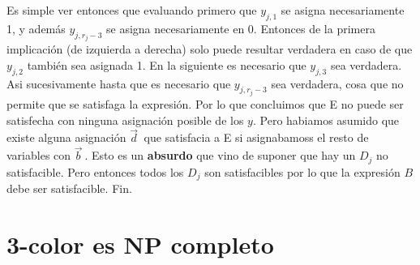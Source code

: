 \documentclass{article}
\begin{document}
Es simple ver entonces que evaluando primero que $y_{j,1}$ se asigna necesariamente 1, y además
$y_{j,r_j-3}$ se asigna necesariamente en 0. Entonces de la primera implicación (de izquierda a
derecha) solo puede resultar verdadera en caso de que $y_{j,2}$ también sea asignada 1. En la 
siguiente es necesario que  $y_{j,3}$ sea verdadera. Asi sucesivamente hasta que es necesario que
$y_{j,r_j-3}$ sea verdadera, cosa que no permite que se satisfaga la expresión. Por lo que 
concluimos que E no puede ser satisfecha con ninguna asignación posible de los $y$.
Pero habiamos asumido que existe alguna asignación $\vec{d}^{\ }$ que satisfacia a E si
asignabamoss el resto de variables con $\vec{b}^{\ }$. Esto es un \textbf{absurdo} que vino de 
suponer que hay un $D_j$ no satisfacible. Pero entonces todos los $D_j$ son satisfacibles por lo
que la expresión $B$ debe ser satisfacible. Fin.

\section{3-color es NP completo}
\end{document}
